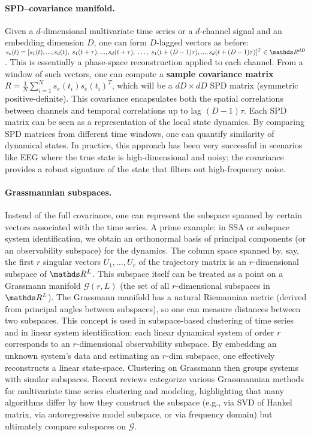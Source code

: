 \documentclass[14pt]{extarticle}
\begin{document}
	\paragraph{SPD–covariance manifold.}  
	Given a $d$-dimensional multivariate time series or a $d$-channel signal and an embedding dimension $D$, one can form $D$-lagged vectors as before: $s_e(t) = [s_1(t), ..., s_d(t),\; s_1(t+\tau),...,s_d(t+\tau),\;\dots,\;s_1(t+(D-1)\tau),...,s_d(t+(D-1)\tau)]^T \in \dR^{dD}$.
	This is essentially a phase-space reconstruction applied to each channel.
	From a window of such vectors, one can compute a \textbf{sample covariance matrix} $R = \frac{1}{N}\sum_{i=1}^N s_e(t_i) s_e(t_i)^T$, which will be a $dD \times dD$ SPD matrix (symmetric positive-definite).
	This covariance encapsulates both the spatial correlations between channels and temporal correlations up to lag $(D-1)\tau$.
	Each SPD matrix can be seen as a representation of the local state dynamics.
	By comparing SPD matrices from different time windows, one can quantify similarity of dynamical states.
	In practice, this approach has been very successful in scenarios like EEG where the true state is high-dimensional and noisy; the covariance provides a robust signature of the state that filters out high-frequency noise.
	
	\paragraph{Grassmannian subspaces.}  
	Instead of the full covariance, one can represent the subspace spanned by certain vectors associated with the time series.
	A prime example: in SSA or subspace system identification, we obtain an orthonormal basis of principal components (or an observability subspace) for the dynamics.
	The column space spanned by, say, the first $r$ singular vectors $U_1,\dots,U_r$ of the trajectory matrix is an $r$-dimensional subspace of $\dR^L$.
	This subspace itself can be treated as a point on a Grassmann manifold $\mathcal{G}(r, L)$ (the set of all $r$-dimensional subspaces in $\dR^L$).
	The Grassmann manifold has a natural Riemannian metric (derived from principal angles between subspaces), so one can measure distances between two subspaces.
	This concept is used in subspace-based clustering of time series and in linear system identification: each linear dynamical system of order $r$ corresponds to an $r$-dimensional observability subspace.
	By embedding an unknown system’s data and estimating an $r$-dim subspace, one effectively reconstructs a linear state-space.
	Clustering on Grassmann then groups systems with similar subspaces.
	Recent reviews categorize various Grassmannian methods for multivariate time series clustering and modeling, highlighting that many algorithms differ by how they construct the subspace (e.g., via SVD of Hankel matrix, via autoregressive model subspace, or via frequency domain) but ultimately compare subspaces on $\mathcal{G}$.
	
\end{document}
